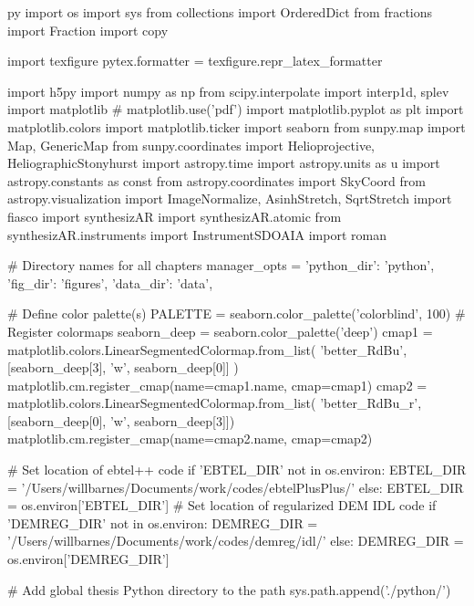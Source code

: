 \begin{pythontexcustomcode}{py}
import os
import sys
from collections import OrderedDict
from fractions import Fraction
import copy

import texfigure
pytex.formatter = texfigure.repr_latex_formatter

import h5py
import numpy as np
from scipy.interpolate import interp1d, splev
import matplotlib
# matplotlib.use('pdf')
import matplotlib.pyplot as plt
import matplotlib.colors
import matplotlib.ticker
import seaborn
from sunpy.map import Map, GenericMap
from sunpy.coordinates import Helioprojective, HeliographicStonyhurst
import astropy.time
import astropy.units as u
import astropy.constants as const
from astropy.coordinates import SkyCoord
from astropy.visualization import ImageNormalize, AsinhStretch, SqrtStretch
import fiasco
import synthesizAR
import synthesizAR.atomic
from synthesizAR.instruments import InstrumentSDOAIA
import roman

# Directory names for all chapters
manager_opts = {'python_dir': 'python', 'fig_dir': 'figures', 'data_dir': 'data',}

# Define color palette(s)
PALETTE = seaborn.color_palette('colorblind', 100)
#  Register colormaps
seaborn_deep = seaborn.color_palette('deep')
cmap1 = matplotlib.colors.LinearSegmentedColormap.from_list(
    'better_RdBu', [seaborn_deep[3], 'w', seaborn_deep[0]]
)
matplotlib.cm.register_cmap(name=cmap1.name, cmap=cmap1)
cmap2 = matplotlib.colors.LinearSegmentedColormap.from_list(
    'better_RdBu_r', [seaborn_deep[0], 'w', seaborn_deep[3]])
matplotlib.cm.register_cmap(name=cmap2.name, cmap=cmap2)

# Set location of ebtel++ code
if 'EBTEL_DIR' not in os.environ:
	EBTEL_DIR = '/Users/willbarnes/Documents/work/codes/ebtelPlusPlus/'
else:
	EBTEL_DIR = os.environ['EBTEL_DIR']
# Set location of regularized DEM IDL code
if 'DEMREG_DIR' not in os.environ:
	DEMREG_DIR = '/Users/willbarnes/Documents/work/codes/demreg/idl/'
else:
	DEMREG_DIR = os.environ['DEMREG_DIR']

# Add global thesis Python directory to the path
sys.path.append('./python/')


\end{pythontexcustomcode}
